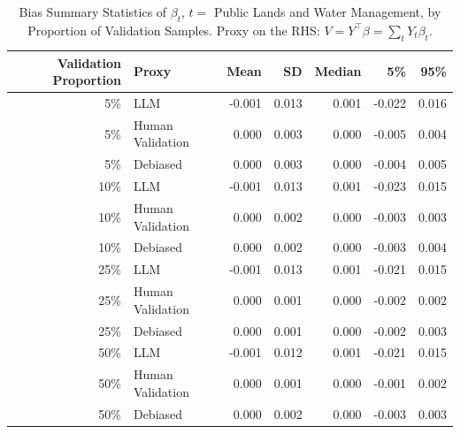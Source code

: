 \begin{table}

\caption{\label{tab:unnamed-chunk-1}Bias Summary Statistics of $\beta_{t}$, $t=$ Public Lands and Water Management, by Proportion of Validation Samples.
      Proxy on the RHS: $V = Y^\top \beta = \sum_{t} Y_t \beta_t$.}
\centering
\begin{tabular}[t]{rlrrrrr}
\toprule
Validation Proportion & Proxy & Mean & SD & Median & 5\% & 95\%\\
\midrule
5\% & LLM & -0.001 & 0.013 & 0.001 & -0.022 & 0.016\\
5\% & Human Validation & 0.000 & 0.003 & 0.000 & -0.005 & 0.004\\
5\% & Debiased & 0.000 & 0.003 & 0.000 & -0.004 & 0.005\\
10\% & LLM & -0.001 & 0.013 & 0.001 & -0.023 & 0.015\\
10\% & Human Validation & 0.000 & 0.002 & 0.000 & -0.003 & 0.003\\
10\% & Debiased & 0.000 & 0.002 & 0.000 & -0.003 & 0.004\\
25\% & LLM & -0.001 & 0.013 & 0.001 & -0.021 & 0.015\\
25\% & Human Validation & 0.000 & 0.001 & 0.000 & -0.002 & 0.002\\
25\% & Debiased & 0.000 & 0.001 & 0.000 & -0.002 & 0.003\\
50\% & LLM & -0.001 & 0.012 & 0.001 & -0.021 & 0.015\\
50\% & Human Validation & 0.000 & 0.001 & 0.000 & -0.001 & 0.002\\
50\% & Debiased & 0.000 & 0.002 & 0.000 & -0.003 & 0.003\\
\bottomrule
\end{tabular}
\end{table}
